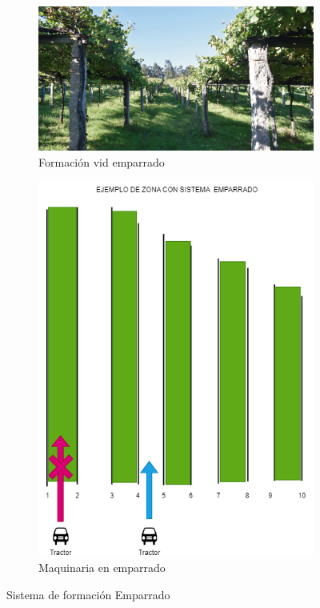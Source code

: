   \begin{figure}[hp!]
    \centering
    \begin{subfigure}[c]{0.75\textwidth}
      \includegraphics[width=\textwidth]{imaxes/sistema_emparrado.png}
      \caption{Formación vid emparrado}
      \label{fig:emparrado}
    \end{subfigure}
    \hspace{0.1\textwidth}
    \begin{subfigure}[c]{0.65\textwidth}
      \includegraphics[width=\textwidth]{imaxes/2-EmparradoTractor.png}
      \caption{Maquinaria en emparrado}
      \label{fig:tractorEmparrado}
    \end{subfigure}
    \caption{Sistema de formación Emparrado}
    \label{fig:exemplo-subfiguras}
  \end{figure}
  
